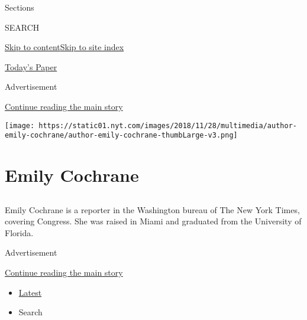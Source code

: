 Sections

SEARCH

\protect\hyperlink{site-content}{Skip to
content}\protect\hyperlink{site-index}{Skip to site index}

\href{https://myaccount.nytimes.com/auth/login?response_type=cookie\&client_id=vi}{}

\href{https://www.nytimes.com/section/todayspaper}{Today's Paper}

Advertisement

\protect\hyperlink{after-top}{Continue reading the main story}

\texttt{[image: https://static01.nyt.com/images/2018/11/28/multimedia/author-emily-cochrane/author-emily-cochrane-thumbLarge-v3.png]}

\hypertarget{emily-cochrane}{%
\section{Emily Cochrane}\label{emily-cochrane}}

\hypertarget{section}{%
\subsection{}\label{section}}

Emily Cochrane is a reporter in the Washington bureau of The New York
Times, covering Congress. She was raised in Miami and graduated from the
University of Florida.

Advertisement

\protect\hyperlink{after-mid1}{Continue reading the main story}

\begin{itemize}
\tightlist
\item
  \protect\hyperlink{stream-panel}{Latest}
\item
  Search
\end{itemize}

